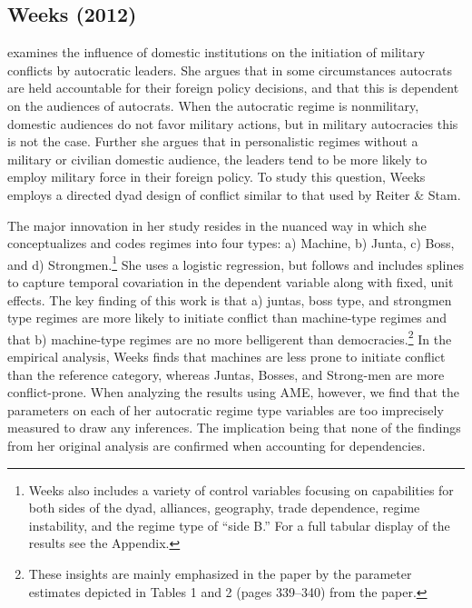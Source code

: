 \subsection{Weeks (2012)}

\citet{weeks:2012} examines the influence of domestic institutions on the initiation of military conflicts by autocratic leaders. She argues that in some circumstances autocrats are held accountable for their foreign policy decisions, and that this is dependent on the audiences of autocrats. When the autocratic regime is nonmilitary, domestic audiences do not favor military actions, but in military autocracies this is not the case. Further she argues that in personalistic regimes without a military or civilian domestic audience, the leaders tend to be more likely to employ military force in their foreign policy. To study this question, Weeks employs a directed dyad design of conflict similar to that used by Reiter \& Stam.

The major innovation in her study resides in the nuanced way in which she conceptualizes and codes regimes into four types: a) Machine, b) Junta, c) Boss, and d) Strongmen.\footnote{Weeks also includes a variety of control variables focusing on capabilities for both sides of the dyad, alliances, geography, trade dependence, regime instability, and the regime type of ``side B.'' For a full tabular display of the results see the Appendix.} She uses a logistic regression, but follows \citet{beck:etal:1998} and includes splines to capture temporal covariation in the dependent variable along with fixed, unit effects. The key finding of this work is that a) juntas, boss type, and strongmen type regimes are more likely to initiate conflict than machine-type regimes and that b) machine-type regimes are no more belligerent than democracies.\footnote{These insights are mainly emphasized in the paper by the parameter estimates depicted in Tables 1 and 2 (pages 339--340) from the paper.} In the empirical analysis, Weeks finds that machines are less prone to initiate conflict than the reference category, whereas Juntas, Bosses, and Strong-men are more conflict-prone. When analyzing the results using AME, however, we find that the parameters on each of her autocratic regime type variables are too imprecisely measured to draw any inferences. The implication being that none of the findings from her original analysis are confirmed when accounting for dependencies. 

